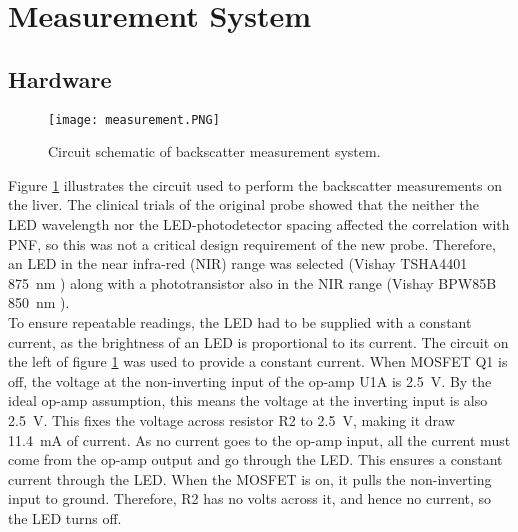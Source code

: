 \section{Measurement System}
\subsection{Hardware}

\begin{figure}[htb]
	\centering
	\texttt{[image: measurement.PNG]}
	\caption{Circuit schematic of backscatter measurement system.}
	\label{fig: measurement schematic}
\end{figure}

Figure \ref{fig: measurement schematic} illustrates the circuit used to perform the backscatter measurements on the liver. The clinical trials of the original probe showed that the neither the LED wavelength nor the LED-photodetector spacing affected the correlation with PNF, so this was not a critical design requirement of the new probe. Therefore, an LED in the near infra-red (NIR) range was selected (Vishay TSHA4401 \SI{875}{\nano\metre} \cite{tsha4401}) along with a phototransistor also in the NIR range (Vishay BPW85B \SI{850}{\nano\metre} \cite{bpw85b}).\\

To ensure repeatable readings, the LED had to be supplied with a constant current, as the brightness of an LED is proportional to its current. The circuit on the left of figure \ref{fig: measurement schematic} was used to provide a constant current. When MOSFET Q1 is off, the voltage at the non-inverting input of the op-amp U1A is \SI{2.5}{\volt}. By the ideal op-amp assumption, this means the voltage at the inverting input is also \SI{2.5}{\volt}. This fixes the voltage across resistor R2 to \SI{2.5}{\volt}, making it draw \SI{11.4}{\milli\ampere} of current. As no current goes to the op-amp input, all the current must come from the op-amp output and go through the LED.  This ensures a constant current through the LED. When the MOSFET is on, it pulls the non-inverting input to ground. Therefore, R2 has no volts across it, and hence no current, so the LED turns off.\\

